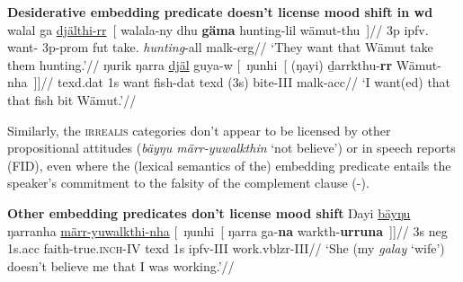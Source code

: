 \pex \textbf{Desiderative embedding predicate doesn't license mood shift in \gls{wd}}
\a\begingl\gla walal ga \ul{djälthi-rr}~\textup{[} walala-ny dhu \textbf{gäma} hunting-lil wämut-thu\textup{~]}//
\glb 3p \gls{ipfv}.\I{} want-\I{} 3p-\gls{prom} \gls{fut} take.\I{} \textit{hunting}-\gls{all} \gls{malk}-\gls{erg}//
\glft`They want that Wämut take them hunting.'//\endgl
\a\begingl\gla ŋurik ŋarra \ul{djäl} guya-w \textup{[}~ŋunhi~\textup{[} (ŋayi)  ḏarrkthu-\textbf{rr} Wämut-nha\textup{~]]}//
\glb \gls{texd}.\gls{dat} 1s want fish-\gls{dat} \gls{texd} (3s) bite-\gls{III} \gls{malk}-\gls{acc}//
\glft`I want(ed) that that fish bit Wämut.'//\endgl
\xe

Similarly, the \textsc{irrealis} categories don't appear to be licensed by other propositional attitudes (\textit{bäyŋu märr-yuwalkthin} `not believe') or in speech reports (\acrshort{FID}), even where the (lexical semantics of the) embedding predicate entails the speaker's commitment to the falsity of the complement clause (-). 

\pex \textbf{Other embedding predicates don't license mood shift}
\a\begingl\gla Ŋayi \ul{bäyŋu} ŋarranha \ul{märr-yuwalkthi-nha} \textup[~ŋunhi~\textup[  ŋarra ga-\textbf{na} warkth-\textbf{urruna}\textup{~]]}//
\glb 3s \gls{neg} 1s.\gls{acc} faith-true.\textsc{inch}-\gls{IV} \gls{texd} 1s \gls{ipfv}-\gls{III} work.\gls{vblzr}-\gls{III}//
\glft`She (my \textit{galay} `wife') doesn't believe me that I was working.'\trailingcitation{[DhG~20190417]}//\endgl

